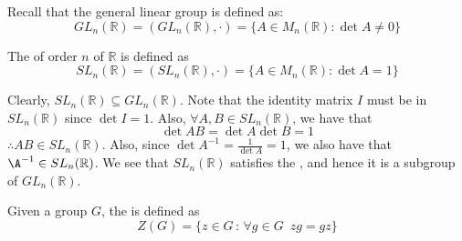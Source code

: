 Recall that the general linear group is defined as:
\begin{equation*}
  GL_n(\mathbb{R}) = (GL_n(\mathbb{R}), \cdot) = \{A \in M_n(\mathbb{R}) : \det A \neq 0 \}
\end{equation*}

\begin{defn}\label{defn:special_linear_group}
  The  of order $n$ of $\mathbb{R}$ is defined as
  \begin{equation*}
    SL_n(\mathbb{R}) = (SL_n(\mathbb{R}), \cdot) = \{A \in M_n(\mathbb{R}) : \det A = 1 \}
  \end{equation*}
\end{defn}

\begin{eg}\label{eg:special_linear_group_as_a_subgroup}
  Clearly, $SL_n(\mathbb{R}) \subseteq GL_n(\mathbb{R})$. Note that the identity matrix $I$ must be in $SL_n(\mathbb{R})$ since $\det I = 1$. Also, $\forall A, B \in SL_n(\mathbb{R})$, we have that
  \begin{equation*}
    \det AB = \det A \det B = 1
  \end{equation*}
  $\therefore AB \in SL_n(\mathbb{R})$. Also, since $\det A^{-1} = \frac{1}{\det A} = 1$, we also have that $\A^{-1} \in SL_n(\mathbb{R})$. We see that $SL_n(\mathbb{R})$ satisfies the , and hence it is a subgroup of $GL_n(\mathbb{R})$.
\end{eg}

\begin{defn}\label{defn:center_of_a_group}
  Given a group $G$, the  is defined as
  \begin{equation*}
    Z(G) = \{z \in G \, : \, \forall g \in G \enspace zg = gz \}
  \end{equation*}
\end{defn}

